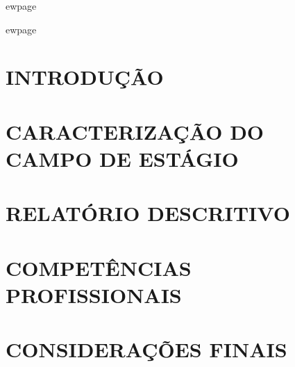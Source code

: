 \documentclass[12pt,a4paper]{article}
\begin{document}
ewpage


\tableofcontents

ewpage
\section{INTRODUÇÃO}


\section{CARACTERIZAÇÃO DO CAMPO DE ESTÁGIO}


\section{RELATÓRIO DESCRITIVO}


\section{COMPETÊNCIAS PROFISSIONAIS}


\section{CONSIDERAÇÕES FINAIS}


\end{document}
